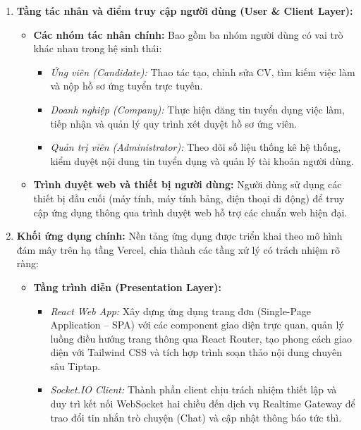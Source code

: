 \begin{enumerate}
    \item \textbf{Tầng tác nhân và điểm truy cập người dùng (User \& Client Layer):}
    \begin{itemize}
        \item \textbf{Các nhóm tác nhân chính:} Bao gồm ba nhóm người dùng có vai trò khác nhau trong hệ sinh thái:
        \begin{itemize}
            \item \textit{Ứng viên (Candidate):} Thao tác tạo, chỉnh sửa CV, tìm kiếm việc làm và nộp hồ sơ ứng tuyển trực tuyến.
            \item \textit{Doanh nghiệp (Company):} Thực hiện đăng tin tuyển dụng việc làm, tiếp nhận và quản lý quy trình xét duyệt hồ sơ ứng viên.
            \item \textit{Quản trị viên (Administrator):} Theo dõi số liệu thống kê hệ thống, kiểm duyệt nội dung tin tuyển dụng và quản lý tài khoản người dùng.
        \end{itemize}
        \item \textbf{Trình duyệt web và thiết bị người dùng:} Người dùng sử dụng các thiết bị đầu cuối (máy tính, máy tính bảng, điện thoại di động) để truy cập ứng dụng thông qua trình duyệt web hỗ trợ các chuẩn web hiện đại.
    \end{itemize}

    \item \textbf{Khối ứng dụng chính:}
    Nền tảng ứng dụng được triển khai theo mô hình đám mây trên hạ tầng Vercel, chia thành các tầng xử lý có trách nhiệm rõ ràng:
    \begin{itemize}
        \item \textbf{Tầng trình diễn (Presentation Layer):}
        \begin{itemize}
            \item \textit{React Web App:} Xây dựng ứng dụng trang đơn (Single-Page Application -- SPA) với các component giao diện trực quan, quản lý luồng điều hướng trang thông qua React Router, tạo phong cách giao diện với Tailwind CSS và tích hợp trình soạn thảo nội dung chuyên sâu Tiptap.
            \item \textit{Socket.IO Client:} Thành phần client chịu trách nhiệm thiết lập và duy trì kết nối WebSocket hai chiều đến dịch vụ Realtime Gateway để trao đổi tin nhắn trò chuyện (Chat) và cập nhật thông báo tức thì.
        \end{itemize}
        

\end{itemize}
\end{enumerate}
